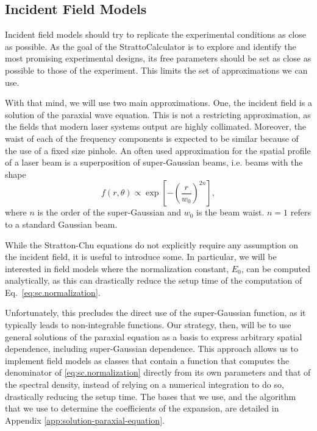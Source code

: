 \documentclass[11pt,SymmetricalJury]{inrsthesis/inrsthesis}
\begin{document}
\subsection{Incident Field Models}

Incident field models should try to replicate the experimental conditions
as close as possible. As the goal of the StrattoCalculator is to explore
and identify the most promising experimental designs, its free parameters
should be set as close as possible to those of the experiment. This limits
the set of approximations we can use.

With that mind, we will use two main approximations. One, the incident field
is a solution of the paraxial wave equation. This is not a restricting approximation,
as the fields that modern laser systems output are highly collimated. Moreover,
the waist of each of the frequency components is expected to be similar because
of the use of a fixed size pinhole.
An often used approximation for the spatial profile of a laser beam is a
superposition of super-Gaussian beams, i.e. beams with the shape
  \begin{equation}
    f(r,\theta) \propto \exp\left[-\left(\frac{r}{w_0}\right)^{2n}\right],
  \end{equation}
where $n$ is the order of the super-Gaussian and $w_0$ is the beam waist.
$n=1$ refers to a standard Gaussian beam.

While the Stratton-Chu equations do not explicitly require any assumption on
the incident field, it is useful to introduce some. In particular, we will be
interested in field models where the normalization constant, $E_0$,
can be computed analytically, as this can drastically reduce the setup time
of the computation of Eq.~\eqref{eq:sc.normalization}.

Unfortunately, this precludes the direct use of the super-Gaussian function,
as it typically leads to non-integrable functions. Our strategy, then, will
be to use general solutions of the paraxial equation as a basis to express
arbitrary spatial dependence, including super-Gaussian dependence.
This approach allows us to implement field models as classes that contain
a function that computes the denominator of \eqref{eq:sc.normalization}
directly from its own parameters and that of the spectral density, instead
of relying on a numerical integration to do so, drastically reducing the
setup time. The bases that we use, and the algorithm that we use to determine
the coefficients of the expansion, are detailed in Appendix \ref{app:solution-paraxial-equation}.
\end{document}
